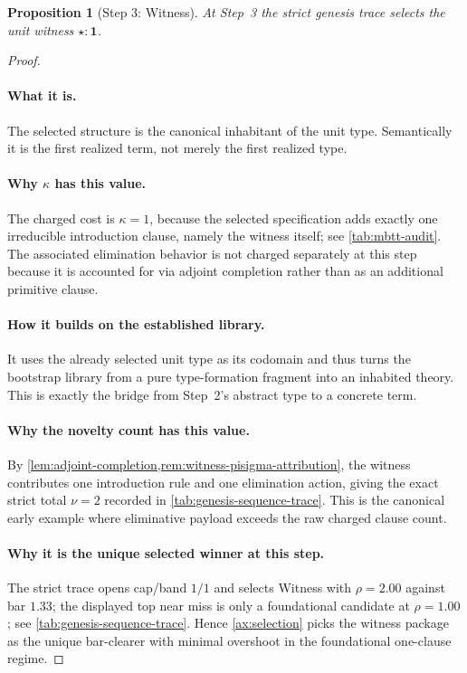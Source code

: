 \documentclass[11pt,a4paper]{article}
\theoremstyle{plain}
\newtheorem{proposition}[theorem]{Proposition}
\theoremstyle{definition}
\theoremstyle{remark}
\begin{document}
\begin{proposition}[Step 3: Witness]
\label{prop:genesis-step3}
At Step~3 the strict genesis trace selects the unit witness
$\star:\mathbf{1}$.
\end{proposition}

\begin{proof}
\paragraph{What it is.}
The selected structure is the canonical inhabitant of the unit type.
Semantically it is the first realized term, not merely the first realized type.

\paragraph{Why $\kappa$ has this value.}
The charged cost is $\kappa=1$, because the selected specification adds exactly
one irreducible introduction clause, namely the witness itself; see
\cref{tab:mbtt-audit}.
The associated elimination behavior is not charged separately at this step
because it is accounted for via adjoint completion rather than as an additional
primitive clause.

\paragraph{How it builds on the established library.}
It uses the already selected unit type as its codomain and thus turns the
bootstrap library from a pure type-formation fragment into an inhabited theory.
This is exactly the bridge from Step~2's abstract type to a concrete term.

\paragraph{Why the novelty count has this value.}
By \cref{lem:adjoint-completion,rem:witness-pisigma-attribution}, the witness
contributes one introduction rule and one elimination action, giving the exact
strict total $\nu=2$ recorded in \cref{tab:genesis-sequence-trace}.
This is the canonical early example where eliminative payload exceeds the raw
charged clause count.

\paragraph{Why it is the unique selected winner at this step.}
The strict trace opens cap/band $1/1$ and selects Witness with
$\rho=2.00$ against bar $1.33$; the displayed top near miss is only a
foundational candidate at $\rho=1.00$; see
\cref{tab:genesis-sequence-trace}.
Hence \cref{ax:selection} picks the witness package as the unique bar-clearer
with minimal overshoot in the foundational one-clause regime.
\end{proof}
\end{document}
